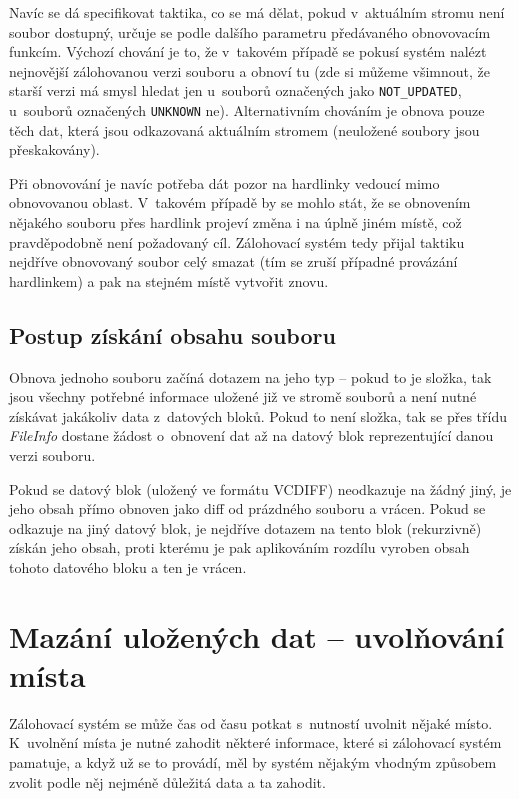 Navíc se dá specifikovat taktika, co se má dělat, pokud v~aktuálním stromu není
soubor dostupný, určuje se podle dalšího parametru předávaného obnovovacím
funkcím. Výchozí chování je to, že v~takovém případě se pokusí systém nalézt
nejnovější zálohovanou verzi souboru a obnoví tu (zde si můžeme všimnout, že
starší verzi má smysl hledat jen u~souborů označených jako
\texttt{NOT\_UPDATED}, u~souborů označených \texttt{UNKNOWN} ne). Alternativním
chováním je obnova pouze těch dat, která jsou odkazovaná aktuálním stromem
(neuložené soubory jsou přeskakovány).

Při obnovování je navíc potřeba dát pozor na hardlinky vedoucí mimo obnovovanou
oblast. V~takovém případě by se mohlo stát, že se obnovením nějakého souboru
přes hardlink projeví změna i na úplně jiném místě, což pravděpodobně není
požadovaný cíl. Zálohovací systém tedy přijal taktiku nejdříve obnovovaný soubor
celý smazat (tím se zruší případné provázání hardlinkem) a pak na stejném místě
vytvořit znovu.

\subsection{Postup získání obsahu souboru}

Obnova jednoho souboru začíná dotazem na jeho typ -- pokud to je složka, tak
jsou všechny potřebné informace uložené již ve stromě souborů a není nutné
získávat jakákoliv data z~datových bloků. Pokud to není složka, tak se přes
třídu {\it FileInfo} dostane žádost o~obnovení dat až na datový blok
reprezentující danou verzi souboru.

Pokud se datový blok (uložený ve formátu \gls{VCDIFF}) neodkazuje na žádný jiný,
je jeho obsah přímo obnoven jako diff od prázdného souboru a vrácen. Pokud se
odkazuje na jiný datový blok, je nejdříve dotazem na tento blok (rekurzivně)
získán jeho obsah, proti kterému je pak aplikováním rozdílu vyroben obsah tohoto
datového bloku a ten je vrácen.

\section{Mazání uložených dat -- uvolňování místa}

Zálohovací systém se může čas od času potkat s~nutností uvolnit nějaké místo.
K~uvolnění místa je nutné zahodit některé informace, které si zálohovací systém
pamatuje, a když už se to provádí, měl by systém nějakým vhodným způsobem zvolit
podle něj nejméně důležitá data a ta zahodit.


